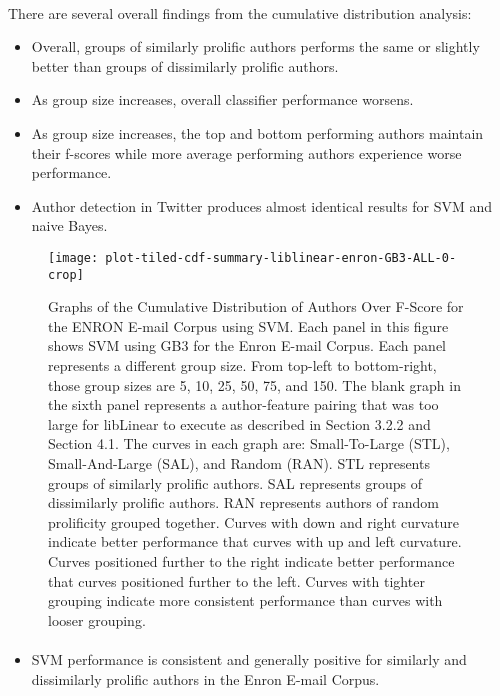 	\paragraph*{} There are several overall findings from the cumulative distribution analysis:
	\begin{itemize}
	\item Overall, groups of similarly prolific authors performs the same or slightly better than groups of dissimilarly prolific authors.
	\item As group size increases, overall classifier performance worsens.
	\item As group size increases, the top and bottom performing authors maintain their f-scores while more average performing authors experience worse performance.
	\item Author detection in Twitter produces almost identical results for SVM and naive Bayes.
	\end{itemize}


	\begin{figure}[htbp!]
		\begin{center}
		\centering
		\texttt{[image: plot-tiled-cdf-summary-liblinear-enron-GB3-ALL-0-crop]}
		\caption{Graphs of the Cumulative Distribution of Authors Over F-Score for the ENRON E-mail Corpus using SVM. Each panel in this figure shows SVM using GB3 for the Enron E-mail Corpus.  Each panel represents a different group size.  From top-left to bottom-right, those group sizes are 5, 10, 25, 50, 75, and 150.  The blank graph in the sixth panel represents a author-feature pairing that was too large for libLinear to execute as described in Section 3.2.2 and Section 4.1.  The curves in each graph are: Small-To-Large (STL), Small-And-Large (SAL), and Random (RAN).  STL represents groups of similarly prolific authors.  SAL represents groups of dissimilarly prolific authors.  RAN represents authors of random prolificity grouped together.  Curves with down and right curvature indicate better performance that curves with up and left curvature.  Curves positioned further to the right indicate better performance that curves positioned further to the left.  Curves with tighter grouping indicate more consistent performance than curves with looser grouping.}
		\label{fig:plot-tiled-cdf-summary-liblinear-enron-GB3-ALL-0}
		\end{center}
	\end{figure}

\paragraph*{} 
	\begin{itemize}
	\item SVM performance is consistent and generally positive for similarly and dissimilarly prolific authors in the Enron E-mail Corpus.
	\end{itemize}
